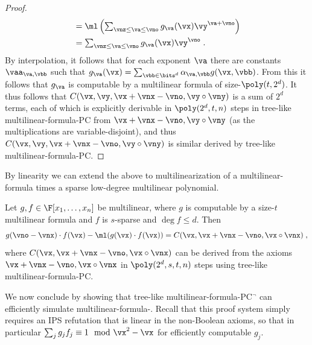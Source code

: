 \documentclass{toc}
\begin{document}
\begin{proof}
\begin{align*}
                &=\textstyle\ml\left(\sum_{\vnz\le\va\le \vno}g_\va(\vx)\vy^{\va+\vno}\right)\\
                &=\textstyle\sum_{\vnz\le\va\le \vno}g_\va(\vx)\vy^{\vno}
                \;.
        \end{align*}
        By interpolation, it follows that for each exponent $\va$ there are constants $\vaa_{\va,\vbb}$ such that $g_\va(\vx)=\sum_{\vbb\in\bits^d} \alpha_{\va,\vbb}g(\vx,\vbb)$.  From this it follows that $g_\va$ is computable by a multilinear formula of size-$\poly(t,2^d)$.  It thus follows that $C(\vx,\vy,\vx+\vnx-\vno,\vy\circ\vny)$ is a sum of $2^d$ terms, each of which is explicitly derivable in $\poly(2^d,t,n)$ steps in tree-like multilinear-formula-PC from $\vx+\vnx-\vno,\vy\circ\vny$ (as the multiplications are variable-disjoint), and thus $C(\vx,\vy,\vx+\vnx-\vno,\vy\circ\vny)$ is similar derived by tree-like multilinear-formula-PC\@.
\end{proof}

By linearity we can extend the above to multilinearization of a multilinear-formula times a sparse low-degree multilinear polynomial.

\begin{corollarywp}\label{res:mult-form-PC:form-sparse}
        Let $g,f\in\F[x_1,\ldots,x_n]$ be multilinear, where $g$ is computable by a size-$t$ multilinear formula and $f$ is $s$-sparse and $\deg f\le d$.  Then
        \[
                g(\vno-\vnx)\cdot f(\vx) - \ml(g(\vx)\cdot f(\vx))
                =C(\vx,\vx+\vnx-\vno,\vx\circ\vnx)
                \;,
        \]
        where $C(\vx,\vx+\vnx-\vno,\vx\circ\vnx)$ can be derived from the axioms $\vx+\vnx-\vno,\vx\circ\vnx$ in $\poly(2^d,s,t,n)$ steps using tree-like multilinear-formula-PC\@.
\end{corollarywp}

We now conclude by showing that tree-like multilinear-formula-PC$^\neg$ can efficiently simulate multilinear-formula-\lbIPS.  Recall that this proof system simply requires an IPS refutation that is linear in the non-Boolean axioms, so that in particular $\sum_j g_jf_j\equiv 1\mod \vx^2-\vx$ for efficiently computable $g_j$.
\end{document}
